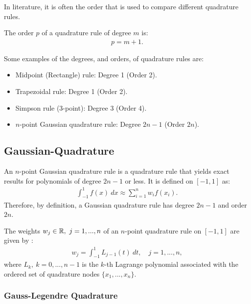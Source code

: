 In literature, it is often the order that is used to compare different quadrature rules.

\begin{definition}
    The order $p$ of a quadrature rule of degree $m$ is: \cite[Def.~7.4.1.1]{hiptmair_numerical_2020}
    \begin{align}
        p = m + 1.
    \end{align}
\end{definition}

Some examples of the degrees, and orders, of quadrature rules are:
\begin{itemize}
    \item Midpoint (Rectangle) rule: Degree 1 (Order 2).
    \item Trapezoidal rule: Degree 1 (Order 2).
    \item Simpson rule (3-point): Degree 3 (Order 4).
    \item $n$-point Gaussian quadrature rule: Degree $2n - 1$ (Order $2n$).
\end{itemize}

\subsection{Gaussian-Quadrature}

\begin{definition}
    An $n$-point Gaussian quadrature rule is a quadrature rule that yields exact results for polynomials of degree $2n - 1$ or less.
    It is defined on $[-1, 1]$ as:
    \begin{align}
        \int_{-1}^1 f(x) \ dx \approx \sum_{i=1}^n w_i f(x_i).
    \end{align}
    Therefore, by definition, a Gaussian quadrature rule has degree $2n - 1$ and order $2n$.
\end{definition}

The weights $w_j \in \mathbb{R}, \ j=1, ..., n$ of an $n$-point quadrature rule on $[-1, 1]$ are given by
\cite[Thm.~7.4.1.6]{hiptmair_numerical_2020}:
\begin{align}
    w_j = \int_{-1}^1 L_{j-1}(t) \ dt, \quad j=1, ..., n,
    \label{eq:quad_weights}
\end{align}
where $L_k, \ k = 0, ..., n-1$ is the $k$-th Lagrange polynomial associated with the ordered
set of quadrature nodes $\{ x_1, ..., x_n \}$.

\subsubsection{Gauss-Legendre Quadrature}

